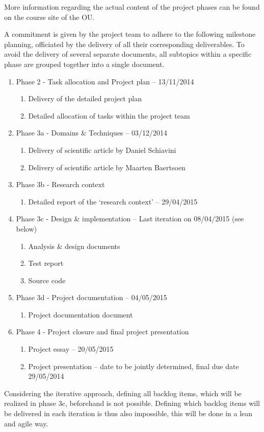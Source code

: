 More information regarding the actual content of the project phases can be found on the course site of the OU. 

A commitment is given by the project team to adhere to the following milestone planning, officiated by the delivery of all their corresponding deliverables. To avoid the delivery of several separate documents, all subtopics within a specific phase are grouped together into a single document.

 \begin{enumerate}
	\item Phase 2 - Task allocation and Project plan			-- 	13/11/2014
 	\begin{enumerate}
		\item Delivery of the detailed project plan 			
		\item Detailed allocation of tasks within the project team 
	\end {enumerate}
	\item Phase 3a - Domains \& Techniques					-- 	03/12/2014
 	\begin{enumerate}
		\item Delivery of scientific article by Daniel Schiavini
		\item Delivery of scientific article by Maarten Baertsoen
	\end {enumerate}
 	\item Phase 3b - Research context
 	\begin{enumerate}
		\item Detailed report of the `research context'  		-- 	29/04/2015
	\end {enumerate}
 	\item Phase 3c - Design \& implementation				-- Last iteration on 08/04/2015 (see below)
 	\begin{enumerate}
		\item Analysis \& design documents
		\item Test report
		\item Source code
	\end {enumerate}
 	\item Phase 3d - Project documentation					-- 	04/05/2015
 	\begin{enumerate}
		\item Project documentation document	
	\end {enumerate}
	\item Phase 4 - Project closure and final project presentation
 	\begin{enumerate}
		\item Project essay							-- 	20/05/2015
		\item Project presentation						-- 	date to be jointly determined, final due date 29/05/2014
	\end {enumerate}
\end {enumerate}
%
Considering the iterative approach, defining all backlog items, which will be realized in phase 3c, beforehand is not possible.
Defining which backlog items will be delivered in each iteration is thus also impossible, this will be done in a lean and agile way.

